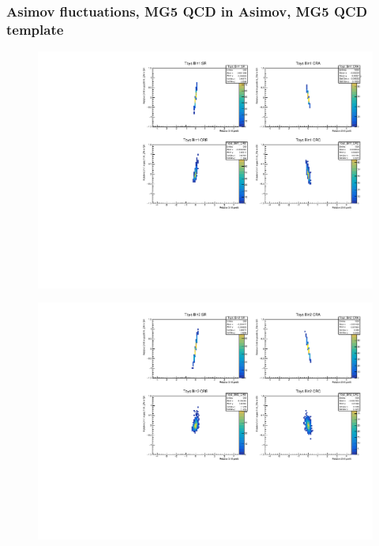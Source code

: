 \subsubsection{\mjj Asimov fluctuations, MG5 QCD in Asimov, MG5 QCD template}
\begin{figure}[H]
\includegraphics[width=\textwidth]{plots/diffx/instab/linearfx/instabilities_mjj_QCD_Mgraph_Signal_Sh2211_BSDATASTATS_linearfx_newbinning_madgraphasimov_bin1.pdf}
\end{figure}
\begin{figure}[H]
\includegraphics[width=\textwidth]{plots/diffx/instab/linearfx/instabilities_mjj_QCD_Mgraph_Signal_Sh2211_BSDATASTATS_linearfx_newbinning_madgraphasimov_bin2.pdf}
\end{figure}
